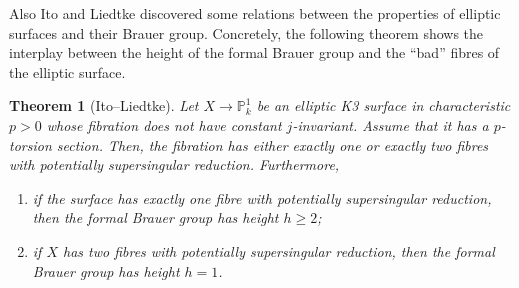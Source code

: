 \documentclass{report}
\newtheorem{theorem}{Theorem}[chapter]
\theoremstyle{definition}
\begin{document}
Also Ito and Liedtke \cite[Theorem~3.5]{ito2010elliptic} discovered some relations between the properties of elliptic surfaces and their Brauer group. Concretely, the following theorem shows the interplay between the height of the formal Brauer group and the ``bad'' fibres of the elliptic surface.

\begin{theorem}[Ito--Liedtke]
Let $X\rightarrow\mathbb{P}_k^1$ be an elliptic K3 surface in characteristic $p>0$ whose fibration does not have constant $j$-invariant. Assume that it has a $p$-torsion section. Then, the fibration has either exactly one or exactly two fibres with potentially supersingular reduction. Furthermore,
\begin{enumerate}[label=\arabic*.]
\item if the surface has exactly one fibre with potentially supersingular reduction, then the formal Brauer group has height $h\geq2$;
\item if $X$ has two fibres with potentially supersingular reduction, then the formal Brauer group has height $h=1$.
\end{enumerate}
\end{theorem}



\end{document}
